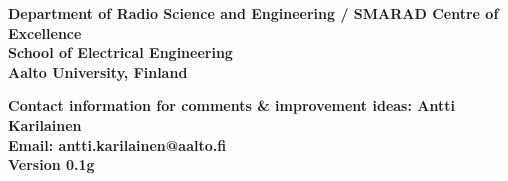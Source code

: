 \documentclass[portrait,a0,final]{a0poster} %
\begin{document}
\begin{minipage}{0.98\linewidth}
\begin{minipage}[t]{0.47\linewidth}
{\footnotesize %





} %



\end{minipage}
\end{minipage} %





\vfill %


\begin{minipage}{0.95\linewidth} %


\footnotesize %


\begin{minipage}[t]{0.47\linewidth}%
\vspace{0pt}

\textsf{\textbf{Department of Radio Science and Engineering / SMARAD Centre of Excellence\\
School of Electrical Engineering\\
Aalto University, Finland}}

\end{minipage} %
\hspace{0.03\linewidth}
\begin{minipage}[t]{0.47\linewidth} %
\vspace{0pt}

\textsf{\textbf{Contact information for comments \& improvement ideas: Antti Karilainen\\
Email: antti.karilainen@aalto.fi\\
Version 0.1g}}
\end{minipage}



\end{minipage}




\vspace*{0.03\linewidth} %
\end{document}
